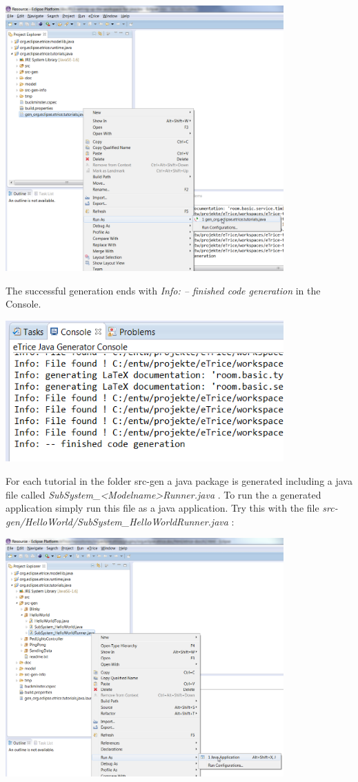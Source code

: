 \includegraphics[width=0.8\textwidth]{images/013-SetupWorkspace05.png}

The successful generation ends with \emph{Info: -- finished code generation} in the Console.

\includegraphics[width=0.8\textwidth]{images/013-SetupWorkspace051.png}


For each tutorial in the folder src-gen a java package is generated including a java file called 
\emph{SubSystem\_<Modelname>Runner.java} . To run the a generated application simply run this file as a java application.
Try this with the file \emph{src-gen/HelloWorld/SubSystem\_HelloWorldRunner.java} :

\includegraphics[width=0.8\textwidth]{images/013-SetupWorkspace06.png}

